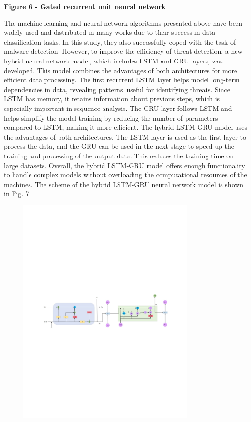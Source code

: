 {\bfseries Figure 6 - Gated recurrent unit neural network}

The machine learning and neural network algorithms presented above have
been widely used and distributed in many works due to their success in
data classification tasks. In this study, they also successfully coped
with the task of malware detection. However, to improve the efficiency
of threat detection, a new hybrid neural network model, which includes
LSTM and GRU layers, was developed. This model combines the advantages
of both architectures for more efficient data processing. The first
recurrent LSTM layer helps model long-term dependencies in data,
revealing patterns~useful for identifying threats. Since LSTM has
memory, it retains information about previous steps, which is especially
important in sequence analysis. The GRU layer follows LSTM and helps
simplify the model training by reducing the number of parameters
compared to LSTM, making it more efficient. The hybrid LSTM-GRU model
uses the advantages of both architectures. The LSTM layer is used as the
first layer to process the data, and the GRU can be used in the next
stage to speed up the training and processing of the output data. This
reduces the training time on large datasets. Overall, the hybrid
LSTM-GRU model offers enough functionality to handle complex models
without overloading the computational resources of the machines. The
scheme of the hybrid LSTM-GRU neural network model is shown in Fig. 7.

\begin{figure}[H]
	\centering
	\includegraphics[width=0.8\textwidth]{media/ict/image80}
	\caption*{}
\end{figure}


